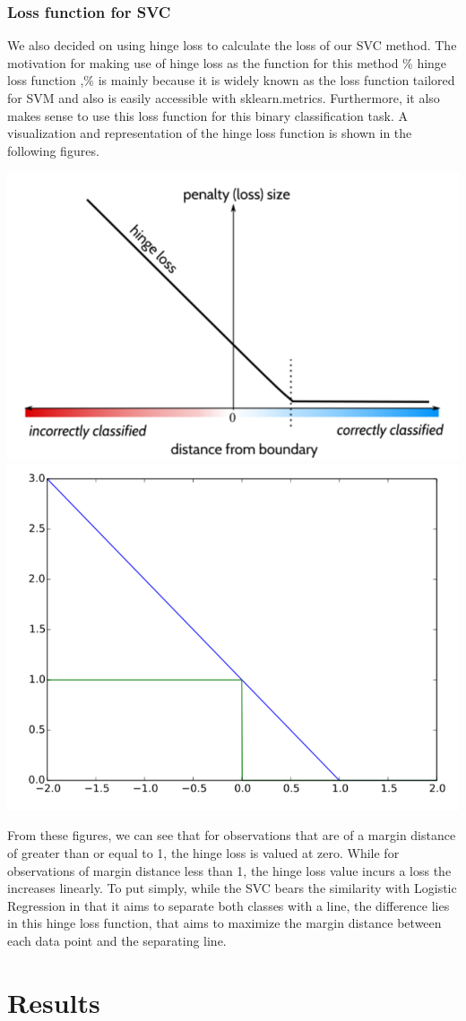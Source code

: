 \documentclass[a4paper,12pt]{article}
\begin{document}
\subsubsection{Loss function for SVC}
\label{sec:orgd815911}

We also decided on using hinge loss to calculate the loss of our SVC method. The motivation for making use of hinge loss as the function for this method \% hinge loss function  ,\% is mainly because it is widely known as the loss function tailored for SVM and also is easily accessible with sklearn.metrics. Furthermore, it also makes sense to use this loss function for this binary classification task. A visualization and representation of the hinge loss function is shown in the following figures.


\includegraphics[height=0.3\textwidth]{./graphs/svc_1.png}
\includegraphics[height=0.3\textwidth]{./graphs/svc_2.png}


From these figures, we can see that for observations that are of a margin distance of greater than or equal to 1, the hinge loss is valued at zero. While for observations of margin distance less than 1, the hinge loss value incurs a loss the increases linearly. To put simply, while the SVC bears the similarity with Logistic Regression in that it aims to separate both classes with a line, the difference lies in this hinge loss function, that aims to maximize the margin distance between each data point and the separating line.

\section{Results}
\label{sec:orgcb52c55}
\end{document}
